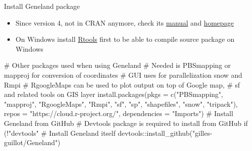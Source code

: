 \documentclass[compress, xelatex, 11pt, xcolor=svgnames, aspectratio=169, url={hyphens, lowtilde}]{beamer}
\begin{document}
\begin{frame}[fragile]{Install Geneland package}
	\label{Geneland}
	\begin{itemize}
		\item Since version 4, not in CRAN anymore, check its \href{https://github.com/gilles-guillot/Geneland/blob/master/vignettes/Geneland.pdf}{manual} and \href{https://github.com/gilles-guillot/Geneland}{homepage}
		\item \alert{On Windows} install \href{https://cran.r-project.org/bin/windows/Rtools/}{Rtools} first to be able to compile source package on Windows
	\end{itemize}
	\begin{spluscode}
    # Other packages used when using Geneland
    # Needed is PBSmapping or mapproj for conversion of coordinates
    # GUI uses for parallelization snow and Rmpi
    # RgoogleMaps can be used to plot output on top of Google map,
    # sf and related tools on GIS layer
    install.packages(pkgs = c("PBSmapping", "mapproj", "RgoogleMaps", "Rmpi",
      "sf", "sp", "shapefiles", "snow", "tripack"),
      repos = "https://cloud.r-project.org/", dependencies = "Imports")
    # Install Geneland from GitHub
    # Devtools package is required to install from GitHub
    if (!"devtools" %
    # Install Geneland itself
    devtools::install_github("gilles-guillot/Geneland")
	\end{spluscode}
\end{frame}
\end{document}
